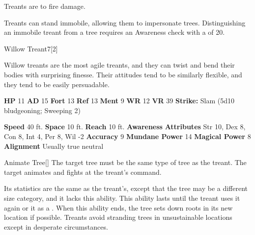         Treants are  to fire damage.
      
        Treants can stand immobile, allowing them to impersonate trees.
        Distinguishing an immobile treant from a tree requires an Awareness check with a  of 20.
  

  \begin{monsubsection}{Willow Treant}{7}[2]
    \vspace{-1em}\vspace{-1em}
    \vspace{0em}

    
          Willow treants are the most agile treants, and they can twist and bend their bodies with surprising finesse.
          Their attitudes tend to be similarly flexible, and they tend to be easily persuadable.
        

    \begin{spellcontent}
      \begin{spelltargetinginfo}
        \pari \textbf{HP} 11 \monsep
          \textbf{AD} 15 \monsep
          \textbf{Fort} 13 \monsep
          \textbf{Ref} 13 \monsep
          \textbf{Ment} 9
        \pari \textbf{WR} 12 \monsep
        \textbf{VR} 39
        \pari \textbf{Strike:}
            Slam  (5d10 bludgeoning; Sweeping 2)
      \end{spelltargetinginfo}
    \end{spellcontent}
    \begin{monsterfooter}
      \pari \textbf{Speed} 40 ft. \monsep
        \textbf{Space} 10 ft. \monsep
        \textbf{Reach} 10 ft.
      \pari \textbf{Awareness} 
      \pari \textbf{Attributes}
        Str 10, Dex 8,
        Con 8, Int 4,
        Per 8, Wil -2
      \pari \textbf{Accuracy} 9 \monsep
        \textbf{Mundane Power} 14 \monsep
      \textbf{Magical Power} 8
      \pari \textbf{Alignment} Usually true neutral
    \end{monsterfooter}
  \end{monsubsection}
  \begin{freeability}{Animate Tree}[]
      The target tree must be the same type of tree as the treant.
        The target animates and fights at the treant's command.

        Its statistics are the same as the treant's, except that the tree may be a different size category, and it lacks this ability.
        This ability lasts until the treant uses it again or  it as a .
        When this ability ends, the tree sets down roots in its new location if possible.
        Treants avoid stranding trees in unsustainable locations except in desperate circumstances.
    \end{freeability}
  
